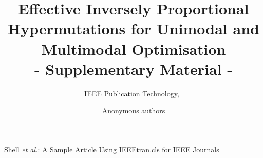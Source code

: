\documentclass[lettersize,journal]{IEEEtran}
\begin{document}
\title{Effective Inversely Proportional Hypermutations for Unimodal and Multimodal Optimisation\\ - Supplementary Material -}

\author{IEEE Publication Technology,~	
        
}
	\author{Anonymous authors	

}

%
{Shell \MakeLowercase{\textit{et al.}}: A Sample Article Using IEEEtran.cls for IEEE Journals}


\maketitle
\end{document}
